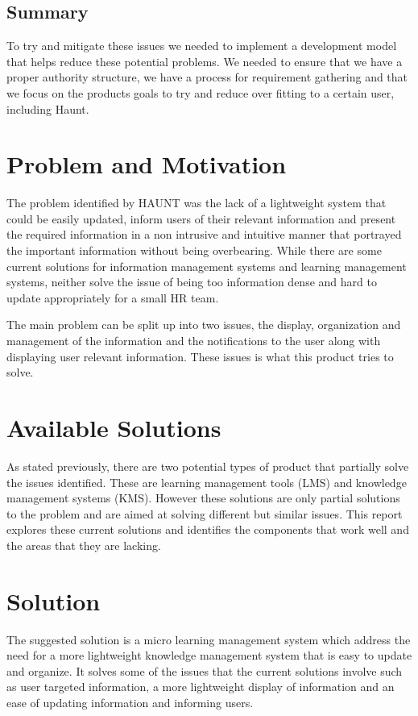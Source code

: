 \subsection{Summary}
To try and mitigate these issues we needed to implement a development model that helps reduce these potential problems. We needed to ensure that we have a proper authority structure, we have a process for requirement gathering and that we focus on the products goals to try and reduce over fitting to a certain user, including Haunt.

\section{Problem and Motivation}
The problem identified by HAUNT was the lack of a lightweight system that could be easily updated, inform users of their relevant information and present the required information in a non intrusive and intuitive manner that portrayed the important information without being overbearing. While there are some current solutions for information management systems and learning management systems, neither solve the issue of being too information dense and hard to update appropriately for a small HR team.

The main problem can be split up into two issues, the display, organization and management of the information and the notifications to the user along with displaying user relevant information. These issues is what this product tries to solve.

\section{Available Solutions}
As stated previously, there are two potential types of product that partially solve the issues identified. These are learning management tools (LMS) and knowledge management systems (KMS). However these solutions are only partial solutions to the problem and are aimed at solving different but similar issues. This report explores these current solutions and identifies the components that work well and the areas that they are lacking.

\section{Solution}
The suggested solution is a micro learning management system which address the need for a more lightweight knowledge management system that is easy to update and organize. It solves some of the issues that the current solutions involve such as user targeted information, a more lightweight display of information and an ease of updating information and informing users.